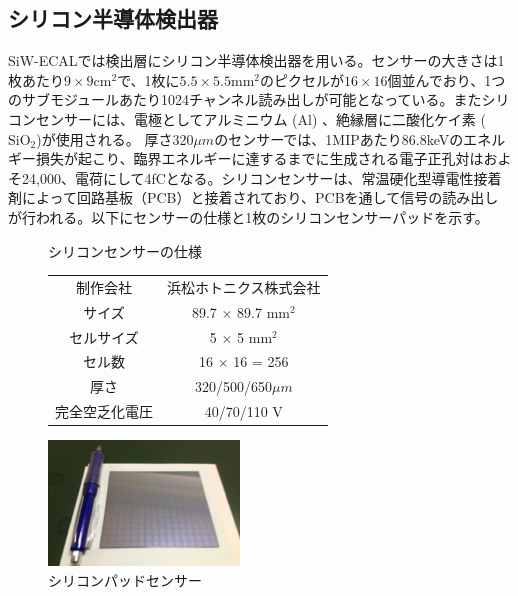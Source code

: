 \subsection{シリコン半導体検出器}
SiW-ECALでは検出層にシリコン半導体検出器を用いる。センサーの大きさは1枚あたり$9 \times 9 \mathrm{{cm}^2}$で、1枚に$5.5 \times 5.5 {\mathrm{mm}^2}$のピクセルが$16 \times 16$個並んでおり、1つのサブモジュールあたり1024チャンネル読み出しが可能となっている。またシリコンセンサーには、電極としてアルミニウム ($\mathrm{Al}$) 、絶縁層に二酸化ケイ素 ($\mathrm{SiO_2}$)が使用される。 厚さ320$\mu m$のセンサーでは、1MIPあたり86.8keVのエネルギー損失が起こり、臨界エネルギーに達するまでに生成される電子正孔対はおよそ24,000、電荷にして4fCとなる。シリコンセンサーは、常温硬化型導電性接着剤によって回路基板（PCB）と接着されており、PCBを通して信号の読み出しが行われる。以下にセンサーの仕様と1枚のシリコンセンサーパッドを示す。
\begin{figure}[H]
 \begin{minipage}[h]{.45\linewidth}
   \centering
   \caption{シリコンセンサーの仕様}
   \begin{tabular}{|c|c|}
         \hline
   	制作会社 & 浜松ホトニクス株式会社\\
	サイズ & 89.7 $\times$ 89.7 $\mathrm{{mm}^2}$ \\
	セルサイズ & 5 $\times$ 5 $\mathrm{{mm}^2}$\\
	セル数 & 16 $\times$ 16 = 256\\
	厚さ & 320/500/650$\mu m$\\
	完全空乏化電圧 & 40/70/110 V\\
        \hline
  \end{tabular}
\end{minipage}
\hfill
\begin{minipage}[h]{.45\linewidth}
	\begin{center}
 \includegraphics[keepaspectratio, scale=0.8]
 	{Figure/Siwecal/si_sensor.png}
 		\caption{シリコンパッドセンサー}
 		\label{sensor}
	\end{center}
\end{minipage}
\end{figure}
